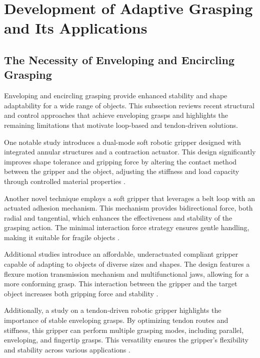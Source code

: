 ﻿%


\section{Development of Adaptive Grasping and Its Applications}
\subsection{The Necessity of Enveloping and Encircling Grasping}
Enveloping and encircling grasping provide enhanced stability and shape adaptability for a wide range of objects. This subsection reviews recent structural and control approaches that achieve enveloping grasps and highlights the remaining limitations that motivate loop-based and tendon-driven solutions.

One notable study introduces a dual-mode soft robotic gripper designed with integrated annular structures and a contraction actuator. This design significantly improves shape tolerance and gripping force by altering the contact method between the gripper and the object, adjusting the stiffness and load capacity through controlled material properties \cite{hu2023dual}.

Another novel technique employs a soft gripper that leverages a belt loop with an actuated adhesion mechanism. This mechanism provides bidirectional force, both radial and tangential, which enhances the effectiveness and stability of the grasping action. The minimal interaction force strategy ensures gentle handling, making it suitable for fragile objects \cite{chen2024soft}.

Additional studies introduce an affordable, underactuated compliant gripper capable of adapting to objects of diverse sizes and shapes. The design features a flexure motion transmission mechanism and multifunctional jaws, allowing for a more conforming grasp. This interaction between the gripper and the target object increases both gripping force and stability \cite{sun2024low}.

Additionally, a study on a tendon-driven robotic gripper highlights the importance of stable enveloping grasps. By optimizing tendon routes and stiffness, this gripper can perform multiple grasping modes, including parallel, enveloping, and fingertip grasps. This versatility ensures the gripper's flexibility and stability across various applications \cite{ciocarlie2014velo}.

